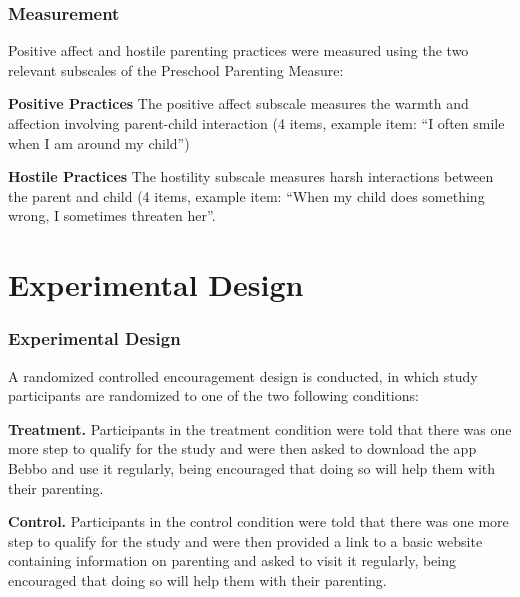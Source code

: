 \documentclass[aspectratio=169]{beamer}
\begin{document}
\begin{frame}
  \frametitle{Measurement}

Positive affect and hostile parenting practices were measured using the two relevant subscales of the Preschool Parenting Measure:

\textbf{Positive Practices}
The positive affect subscale measures the warmth and affection involving parent-child interaction (4 items, example item: “I often smile when I am around my child”)

\textbf{Hostile Practices}
The hostility subscale measures harsh interactions between the parent and child (4 items, example item: “When my child does something wrong, I sometimes threaten her”.


\end{frame}

\section{Experimental Design}

\begin{frame}
  \frametitle{Experimental Design}

A randomized controlled encouragement design is conducted, in which study participants are randomized to one of the two following conditions: 

\textbf{Treatment.} Participants in the treatment condition were told that there was one more step to qualify for the study and were then asked to download the app Bebbo and use it regularly, being encouraged that doing so will help them with their parenting. 

\textbf{Control.} Participants in the control condition were told that there was one more step to qualify for the study and were then provided a link to a basic website containing information on parenting and asked to visit it regularly, being encouraged that doing so will help them with their parenting. 

\end{frame}
\end{document}
